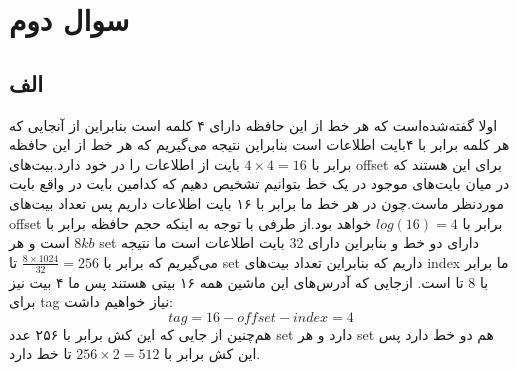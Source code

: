\documentclass[11pt]{article}
\begin{document}
\section{سوال دوم}
\subsection{الف}
اولا گفته‌شده‌است که هر خط از این حافظه دارای ۴ کلمه است بنابراین از آنجایی که هر کلمه برابر با ۴بایت اطلاعات است بنابراین نتیجه می‌گیریم که هر خط از این حافظه برابر با
$4 \times 4 = 16$
بایت از اطلاعات را در خود دارد.بیت‌های offset برای این هستند که در میان بایت‌های موجود در یک خط بتوانیم تشخیص دهیم که کدامین بایت در واقع بایت موردنظر ماست.چون در هر خط ما برابر با ۱۶ بایت اطلاعات داریم پس تعداد بیت‌های offset برابر با
$log(16) = 4$
خواهد بود.از طرفی با توجه به اینکه حجم حافظه‌‌ برابر با 
$8kb$
است و هر set دارای دو خط و بنابراین دارای 32 بایت اطلاعات است ما نتیجه می‌گیریم که برابر با
$\frac{8\times 1024}{32} = 256$
تا set داریم که بنابراین تعداد بیت‌های index ما برابر با 8 تا است. ازجایی که آدر‌س‌های این ماشین همه ۱۶ بیتی هستند پس ما ۴ بیت نیز برای tag نیاز خواهیم داشت:
$$tag = 16 - offset -index = 4$$
هم‌چنین از جایی که این کش برابر با ۲۵۶ عدد set دارد و هر set هم دو خط دارد پس این کش برابر با 
$256\times 2 = 512$
تا خط دارد.
\end{document}
